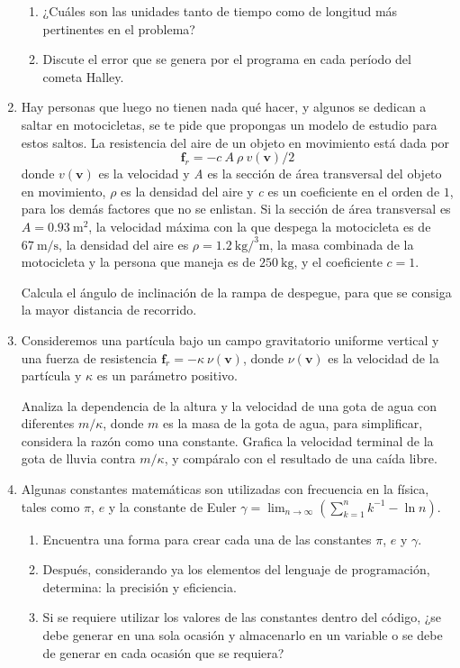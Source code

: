 \documentclass[12pt]{article}
\begin{document}
\begin{enumerate}
\begin{enumerate}
\item ¿Cuáles son las unidades tanto de tiempo como de longitud más pertinentes en el problema?
\item Discute el error que se genera por el programa en cada período del cometa Halley.
\end{enumerate}
\item Hay personas que luego no tienen nada qué hacer, y algunos se dedican a saltar en motocicletas, se te pide que propongas un modelo de estudio para estos saltos. La resistencia del aire de un objeto en movimiento está dada por 
\[ \textbf{f}_{r} = - c \: A \: \rho \: v(\textbf{v})/2 \]
donde $v(\textbf{v})$ es la velocidad y \textit{A} es la sección de área transversal del objeto en movimiento, $\rho$ es la densidad del aire y \textit{c} es un coeficiente en el orden de $1$, para los demás factores que no se enlistan. Si la sección de área transversal es $A = \SI{0.93}{\square\meter}$, la velocidad máxima con la que despega la motocicleta es de $\SI{67}{\meter\per\second}$, la densidad del aire es $\rho = \SI{1.2}{\kilo\gram\per\cubed\meter}$, la masa combinada de la motocicleta y la persona que maneja es de $\SI{250}{\kilo\gram}$, y el coeficiente $c = 1$.
\par
Calcula el ángulo de inclinación de la rampa de despegue, para que se consiga la mayor distancia de recorrido.
\item Consideremos una partícula bajo un campo gravitatorio uniforme vertical y una fuerza de resistencia $\mathbf{f}_{r} = - \kappa \: \nu(\mathbf{v})$, donde $\nu(\mathbf{v})$ es la velocidad de la partícula y $\kappa$ es un parámetro positivo.
\par
Analiza la dependencia de la altura y la velocidad de una gota de agua con diferentes $m/\kappa$, donde $m$ es la masa de la gota de agua, para simplificar, considera la razón como una constante. Grafica la velocidad terminal de la gota de lluvia contra $m/\kappa$, y compáralo con el resultado de una caída libre.
\item Algunas constantes matemáticas son utilizadas con frecuencia en la física, tales como $\pi$, $e$ y la constante de Euler $\gamma = \lim_{n \rightarrow \infty} (\sum_{k = 1}^{n} k^{ - 1} - \ln n)$.
\par
\begin{enumerate}
\item Encuentra una forma para crear cada una de las constantes $\pi$, $e$ y $\gamma$.
\item Después, considerando ya los elementos del lenguaje de programación, determina: la precisión y eficiencia. 
\item Si se requiere utilizar los valores de las constantes dentro del código, ¿se debe generar en una sola ocasión y almacenarlo en un variable o se debe de generar en cada ocasión que se requiera?
\end{enumerate}
\end{enumerate}
\end{document}
